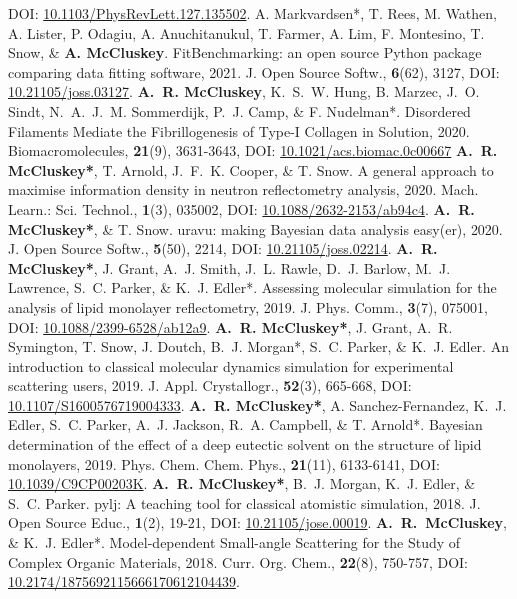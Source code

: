 \begin{benumerate}{25}
    {DOI: \href{https://doi.org/10.1103/PhysRevLett.127.135502}{10.1103/PhysRevLett.127.135502}.}
  \cvpuby
    {A. Markvardsen*, T. Rees, M. Wathen, A. Lister, P. Odagiu, A. Anuchitanukul, T. Farmer, A. Lim, F. Montesino, T. Snow, \& \textbf{A. McCluskey}.}
    {FitBenchmarking: an open source Python package comparing data fitting software,}
    {2021.}
    {J. Open Source Softw.,}
    {\textbf{6}(62), 3127,}
    {DOI: \href{https://doi.org/10.21105/joss.03127}{10.21105/joss.03127}.}
  \cvpuby
    {\textbf{A.~R. McCluskey}, K.~S.~W. Hung, B. Marzec, J.~O. Sindt, N.~A.~J.~M. Sommerdijk, P.~J. Camp, \& F. Nudelman*.}
    {Disordered Filaments Mediate the Fibrillogenesis of Type-I Collagen in Solution,}
    {2020.}
    {Biomacromolecules,}
    {\textbf{21}(9), 3631-3643,}
    {DOI: \href{https://doi.org/10.1021/acs.biomac.0c00667}{10.1021/acs.biomac.0c00667}}
  \cvpuby
    {\textbf{A.~R. McCluskey*}, T. Arnold, J.~F.~K. Cooper, \& T. Snow.}
    {A general approach to maximise information density in neutron reflectometry analysis,}
    {2020.}
    {Mach. Learn.: Sci. Technol.,}
    {\textbf{1}(3), 035002,}
    {DOI: \href{https://doi.org/10.1088/2632-2153/ab94c4}{10.1088/2632-2153/ab94c4}.}
  \cvpuby
    {\textbf{A.~R. McCluskey*}, \& T. Snow.}
    {uravu: making Bayesian data analysis easy(er),}
    {2020.}
    {J. Open Source Softw.,}
    {\textbf{5}(50), 2214,}
    {DOI: \href{https://doi.org/10.21105/joss.02214}{10.21105/joss.02214}.}
  \cvpuby
    {\textbf{A.~R. McCluskey*}, J. Grant, A.~J. Smith, J.~L. Rawle, D.~J. Barlow, M.~J. Lawrence, S.~C. Parker, \& K.~J. Edler*.}
    {Assessing molecular simulation for the analysis of lipid monolayer reflectometry,}
    {2019.}
    {J. Phys. Comm.,}
    {\textbf{3}(7), 075001,}
    {DOI: \href{https://doi.org/10.1088/2399-6528/ab12a9}{10.1088/2399-6528/ab12a9}.}
  \cvpuby
    {\textbf{A.~R. McCluskey*}, J. Grant, A.~R. Symington, T. Snow, J. Doutch, B.~J. Morgan*, S.~C. Parker, \& K.~J. Edler.}
    {An introduction to classical molecular dynamics simulation for experimental scattering users,}
    {2019.}
    {J. Appl. Crystallogr.,}
    {\textbf{52}(3), 665-668,}
    {DOI: \href{https://doi.org/10.1107/S1600576719004333}{10.1107/S1600576719004333}.}
  \cvpuby
    {\textbf{A.~R. McCluskey*}, A. Sanchez-Fernandez, K.~J. Edler, S.~C. Parker, A.~J. Jackson, R.~A. Campbell, \& T. Arnold*.}
    {Bayesian determination of the effect of a deep eutectic solvent on the structure of lipid monolayers,}
    {2019.}
    {Phys. Chem. Chem. Phys.,}
    {\textbf{21}(11), 6133-6141,}
    {DOI: \href{https://doi.org/10.1039/C9CP00203K}{10.1039/C9CP00203K}.}
  \cvpuby
    {\textbf{A.~R. McCluskey*}, B.~J. Morgan, K.~J. Edler, \& S.~C. Parker.}
    {pylj: A teaching tool for classical atomistic simulation,}
    {2018.}
    {J. Open Source Educ.,}
    {\textbf{1}(2), 19-21,}
    {DOI: \href{http://doi.org/10.21105/jose.00019}{10.21105/jose.00019}.}
  \cvpuby
    {\textbf{A.~R.~McCluskey}, \& K.~J. Edler*.}
    {Model-dependent Small-angle Scattering for the Study of Complex Organic Materials,}
    {2018.}
    {Curr. Org. Chem.,}
    {\textbf{22}(8), 750-757,}
    {DOI: \href{http://doi.org/10.2174/1875692115666170612104439}{10.2174/1875692115666170612104439}.}
\end{benumerate}
\vspace{-20pt}
